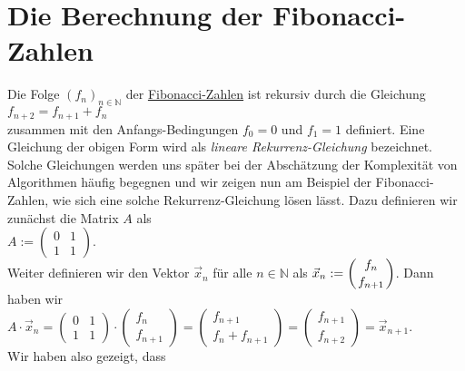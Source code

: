 \section{Die Berechnung der Fibonacci-Zahlen}
Die Folge $(f_n)_{n\in\mathbb{N}}$ der \href{http://de.wikipedia.org/wiki/Fibonacci-Folge}{Fibonacci-Zahlen} ist rekursiv durch die Gleichung
\\[0.2cm]
\hspace*{1.3cm}
$f_{n+2} = f_{n+1} + f_n$
\\[0.2cm]
zusammen mit den Anfangs-Bedingungen $f_0 = 0$ und $f_1 = 1$ definiert.   Eine Gleichung der obigen Form
wird als {\emph{\color{blue}lineare Rekurrenz-Gleichung}} bezeichnet.  Solche Gleichungen werden uns sp\"ater bei
der Absch\"atzung der Komplexit\"at von Algorithmen h\"aufig begegnen und wir zeigen nun am Beispiel der
Fibonacci-Zahlen, wie sich eine solche Rekurrenz-Gleichung l\"osen l\"asst.  Dazu definieren wir
zun\"achst die Matrix $A$ als
\\[0.2cm]
\hspace*{1.3cm}
$A := \left(
  \begin{array}{ll}
    0 & 1 \\
    1 & 1 
  \end{array}
\right)
$.
\\[0.2cm]
Weiter definieren wir den Vektor $\vec{x}_n$ f\"ur alle $n \in \mathbb{N}$ als 
$\displaystyle\vec{x}_n := \left(f_n \atop f_{n+1}\right)$.  Dann haben wir
\\[0.2cm]
\hspace*{1.3cm}
$A \cdot \vec{x}_n = \left(
  \begin{array}{ll}
    0 & 1 \\
    1 & 1 
  \end{array}
\right) \cdot \left(
  \begin{array}{c}
    f_n \\ f_{n+1}
  \end{array} 
\right) = 
\left(
  \begin{array}{c}
     f_{n+1} \\ f_n + f_{n+1}
  \end{array} 
\right) = \left(
  \begin{array}{c}
     f_{n+1} \\ f_{n+2}
  \end{array} 
\right) = \vec{x}_{n+1}.
$
\\[0.2cm]
Wir haben also gezeigt, dass
\\[0.2cm]
\hspace*{1.3cm}
